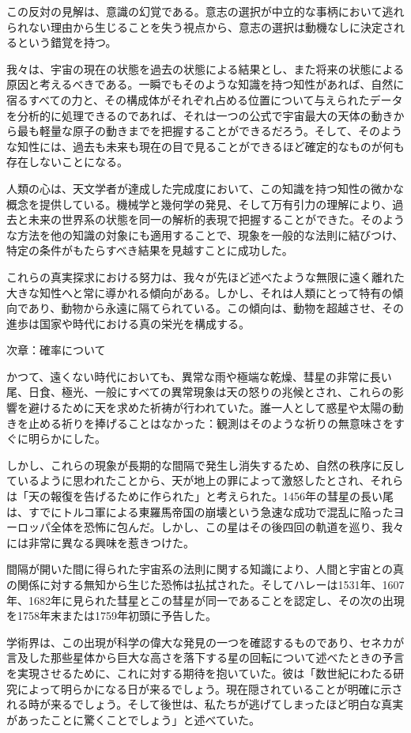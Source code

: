 \documentclass[a4paper,11pt,openany]{ltjsbook}
\begin{document}
この反対の見解は、意識の幻覚である。意志の選択が中立的な事柄において逃れられない理由から生じることを失う視点から、意志の選択は動機なしに決定されるという錯覚を持つ。

我々は、宇宙の現在の状態を過去の状態による結果とし、また将来の状態による原因と考えるべきである。一瞬でもそのような知識を持つ知性があれば、自然に宿るすべての力と、その構成体がそれぞれ占める位置について与えられたデータを分析的に処理できるのであれば、それは一つの公式で宇宙最大の天体の動きから最も軽量な原子の動きまでを把握することができるだろう。そして、そのような知性には、過去も未来も現在の目で見ることができるほど確定的なものが何も存在しないことになる。

人類の心は、天文学者が達成した完成度において、この知識を持つ知性の微かな概念を提供している。機械学と幾何学の発見、そして万有引力の理解により、過去と未来の世界系の状態を同一の解析的表現で把握することができた。そのような方法を他の知識の対象にも適用することで、現象を一般的な法則に結びつけ、特定の条件がもたらすべき結果を見越すことに成功した。

これらの真実探求における努力は、我々が先ほど述べたような無限に遠く離れた大きな知性へと常に導かれる傾向がある。しかし、それは人類にとって特有の傾向であり、動物から永遠に隔てられている。この傾向は、動物を超越させ、その進歩は国家や時代における真の栄光を構成する。

次章：確率について

かつて、遠くない時代においても、異常な雨や極端な乾燥、彗星の非常に長い尾、日食、極光、一般にすべての異常現象は天の怒りの兆候とされ、これらの影響を避けるために天を求めた祈祷が行われていた。誰一人として惑星や太陽の動きを止める祈りを捧げることはなかった：観測はそのような祈りの無意味さをすぐに明らかにした。

しかし、これらの現象が長期的な間隔で発生し消失するため、自然の秩序に反しているように思われたことから、天が地上の罪によって激怒したとされ、それらは「天の報復を告げるために作られた」と考えられた。1456年の彗星の長い尾は、すでにトルコ軍による東羅馬帝国の崩壊という急速な成功で混乱に陥ったヨーロッパ全体を恐怖に包んだ。しかし、この星はその後四回の軌道を巡り、我々には非常に異なる興味を惹きつけた。

間隔が開いた間に得られた宇宙系の法則に関する知識により、人間と宇宙との真の関係に対する無知から生じた恐怖は払拭された。そしてハレーは1531年、1607年、1682年に見られた彗星とこの彗星が同一であることを認定し、その次の出現を1758年末または1759年初頭に予告した。

学術界は、この出現が科学の偉大な発見の一つを確認するものであり、セネカが言及した那些星体から巨大な高さを落下する星の回転について述べたときの予言を実現させるために、これに対する期待を抱いていた。彼は「数世紀にわたる研究によって明らかになる日が来るでしょう。現在隠されていることが明確に示される時が来るでしょう。そして後世は、私たちが逃げてしまったほど明白な真実があったことに驚くことでしょう」と述べていた。
\end{document}
